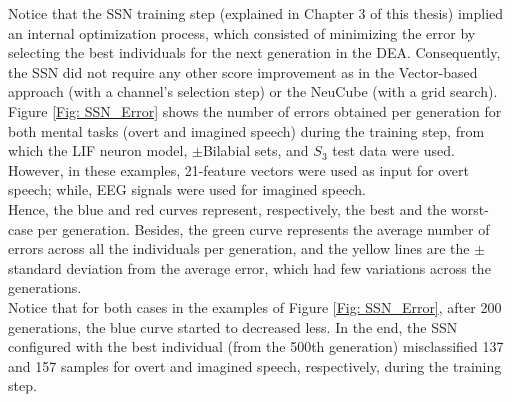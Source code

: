 Notice that the SSN training step (explained in Chapter 3 of this thesis) implied an internal optimization process, which consisted of minimizing the error by selecting the best individuals for the next generation in the DEA. Consequently, the SSN did not require any other score improvement as in the Vector-based approach (with a channel's selection step) or the NeuCube (with a grid search).\\

Figure \ref{Fig: SSN_Error} shows the number of errors obtained per generation for both mental tasks (overt and imagined speech) during the training step, from which the LIF neuron model, $\pm$Bilabial sets, and $S_{3}$ test data were used. However, in these examples, 21-feature vectors were used as input for overt speech; while, EEG signals were used for imagined speech.\\

Hence, the blue and red curves represent, respectively, the best and the worst-case per generation. Besides, the green curve represents the average number of errors across all the individuals per generation, and the yellow lines are the $\pm$standard deviation from the average error, which had few variations across the generations.\\

Notice that for both cases in the examples of Figure \ref{Fig: SSN_Error}, after 200 generations, the blue curve started to decreased less. In the end, the SSN configured with the best individual (from the 500th generation) misclassified 137 and 157 samples for overt and imagined speech, respectively, during the training step.\\

